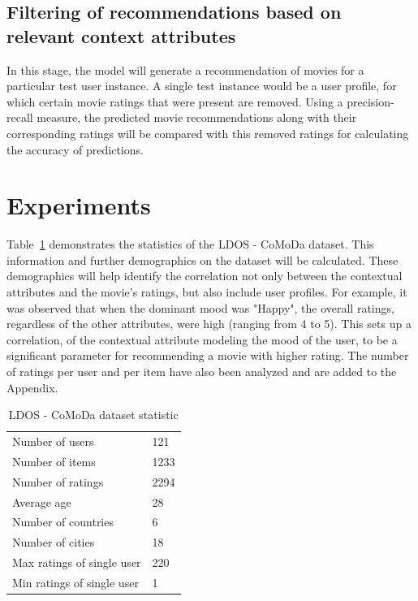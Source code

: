 \documentclass{article}
\begin{document}
\subsection{Filtering of recommendations based on relevant context attributes}
In this stage, the model will generate a recommendation of movies for a particular test user instance. A single test instance would be a user profile, for which certain movie ratings that were present are removed. Using a precision-recall measure, the predicted movie recommendations along with their corresponding ratings will be compared with this removed ratings for calculating the accuracy of predictions.

\section{Experiments}
Table~\ref{ldos} demonstrates the statistics of the LDOS - CoMoDa dataset. This information and further demographics on the dataset will be calculated. These demographics will help identify the correlation not only between the contextual attributes and the movie's ratings, but also include user profiles. For example, it was observed that when the dominant mood was "Happy", the overall ratings, regardless of the other attributes, were high (ranging from 4 to 5). This sets up a correlation, of the contextual attribute modeling the mood of the user, to be a significant parameter for recommending a movie with higher rating. The number of ratings per user and per item have also been analyzed and are added to the Appendix.

\begin{table} [H]
	\caption{LDOS - CoMoDa dataset statistic}
	\centering        
    \begin{tabular}{l|l}
    \hline
    Number of users            & 121 \\
    Number of items            & 1233  \\
    Number of ratings          & 2294  \\
    Average age                & 28  \\
    Number of countries        & 6  \\
    Number of cities           & 18  \\
    Max ratings of single user & 220  \\
    Min ratings of single user & 1  \\
    \end{tabular}
    \label{ldos}
\end{table}
\end{document}

